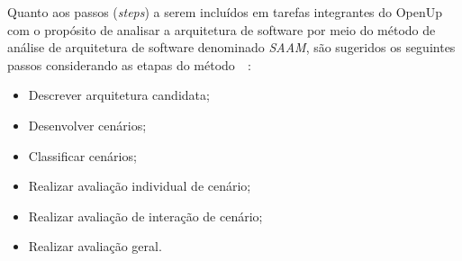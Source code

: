 Quanto aos passos (\emph{steps}) a serem incluídos em tarefas integrantes do OpenUp com o propósito de analisar a arquitetura de software por meio do método de análise de arquitetura de software denominado \emph{\acrfull{SAAM}}, são sugeridos os seguintes passos considerando as etapas do método~\cite{survey_methods}~\cite{scenario_methods}:

\begin{itemize}
    \item Descrever arquitetura candidata;
    \item Desenvolver cenários;
    \item Classificar cenários;
    \item Realizar avaliação individual de cenário;
    \item Realizar avaliação de interação de cenário;
    \item Realizar avaliação geral.


\end{itemize}
